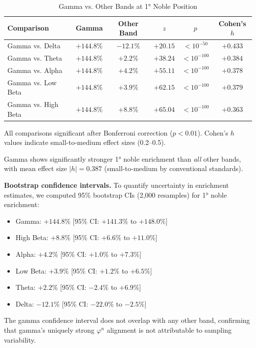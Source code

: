 \documentclass[11pt,a4paper]{article}
\newcommand{\phisym}{\varphi}
\begin{document}
\begin{table}[H]
\centering
\caption{Gamma vs. Other Bands at 1° Noble Position}
\label{tab:gamma_pairwise}
\begin{tabular}{@{}lccccc@{}}
\toprule
Comparison & Gamma & Other Band & $z$ & $p$ & Cohen's $h$ \\
\midrule
Gamma vs. Delta & $+144.8\%$ & $-12.1\%$ & $+20.15$ & $< 10^{-50}$ & $+0.433$ \\
Gamma vs. Theta & $+144.8\%$ & $+2.2\%$ & $+38.24$ & $< 10^{-100}$ & $+0.384$ \\
Gamma vs. Alpha & $+144.8\%$ & $+4.2\%$ & $+55.11$ & $< 10^{-100}$ & $+0.378$ \\
Gamma vs. Low Beta & $+144.8\%$ & $+3.9\%$ & $+62.15$ & $< 10^{-100}$ & $+0.379$ \\
Gamma vs. High Beta & $+144.8\%$ & $+8.8\%$ & $+65.04$ & $< 10^{-100}$ & $+0.363$ \\
\bottomrule
\end{tabular}
\begin{flushleft}
\small
All comparisons significant after Bonferroni correction ($p < 0.01$). Cohen's $h$ values indicate small-to-medium effect sizes (0.2--0.5).
\end{flushleft}
\end{table}

Gamma shows significantly stronger 1° noble enrichment than \textit{all} other bands, with mean effect size $|h| = 0.387$ (small-to-medium by conventional standards).

\textbf{Bootstrap confidence intervals.} To quantify uncertainty in enrichment estimates, we computed 95\% bootstrap CIs (2,000 resamples) for 1° noble enrichment:

\begin{itemize}
    \item Gamma: $+144.8\%$ [95\% CI: $+141.3\%$ to $+148.0\%$]
    \item High Beta: $+8.8\%$ [95\% CI: $+6.6\%$ to $+11.0\%$]
    \item Alpha: $+4.2\%$ [95\% CI: $+1.0\%$ to $+7.3\%$]
    \item Low Beta: $+3.9\%$ [95\% CI: $+1.2\%$ to $+6.5\%$]
    \item Theta: $+2.2\%$ [95\% CI: $-2.4\%$ to $+6.9\%$]
    \item Delta: $-12.1\%$ [95\% CI: $-22.0\%$ to $-2.5\%$]
\end{itemize}

The gamma confidence interval does not overlap with any other band, confirming that gamma's uniquely strong $\phisym^n$ alignment is not attributable to sampling variability.
\end{document}
